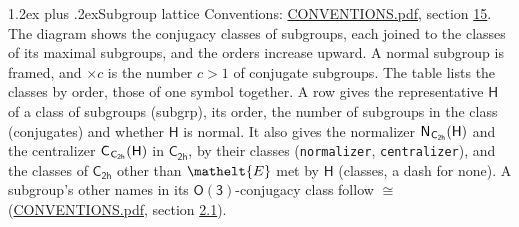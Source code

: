 \documentclass[10pt,a4paper]{article}
\makeatletter
\renewcommand\section{\@startsection{section}{1}{\z@}{-3ex plus -1ex minus -.2ex}%
  {1.2ex plus .2ex}{\normalfont\large\sffamily\bfseries\color{parttitle}}}
\numberwithin{equation}{section}
\newcommand{\eltfont}[1]{{\let\sigma\eltsigma\mathelt{#1}}}
\newcommand{\grp}[1]{\mathsf{#1}}
\newcommand{\cls}[1]{\eltfont{#1}}
\newcommand{\samecls}{\cong}
\newcommand{\hairsp}{\mkern1mu}
\makeatother
\begin{document}
\section{Subgroup lattice}\label{s:subgroups}
Conventions: \href{../../CONVENTIONS.pdf}{CONVENTIONS.pdf}, section \href{../../CONVENTIONS.pdf\#conv.15}{15}.
The diagram shows the conjugacy classes of subgroups, each joined to the classes of its maximal subgroups, and the orders increase upward. \label{n:index.conjugates.c}A normal subgroup is framed, and ${\times}c$ is the number $c > 1$ of conjugate subgroups. The table lists the classes by order, those of one symbol together. \label{n:group.H}\label{n:head.subgroup}\label{n:head.order}\label{n:head.conjugates}\label{n:head.normal}A row gives the representative $\grp{H}$ of a class of subgroups (subgrp), its order, the number of subgroups in the class (conjugates) and whether $\grp{H}$ is normal. \label{n:group.normalizer}\label{n:group.centralizer}\label{n:head.classes}It also gives the normalizer $\grp{N}_{\hairsp \grp{C_{2h}}}(\grp{H})$ and the centralizer $\grp{C}_{\hairsp \grp{C_{2h}}}(\grp{H})$ in $\grp{C_{2h}}$, by their classes (\texttt{normalizer}, \texttt{centralizer}), and the classes of $\grp{C_{2h}}$ other than $\cls{E}$ met by $\grp{H}$ (classes, a dash for none). A subgroup's other names in its \href{O3.pdf}{$\grp{O(3)}$}-conjugacy class follow $\samecls$ (\href{../../CONVENTIONS.pdf}{CONVENTIONS.pdf}, section \href{../../CONVENTIONS.pdf\#conv.2.1}{2.1}).
\begin{center}
\end{center}
\end{document}
